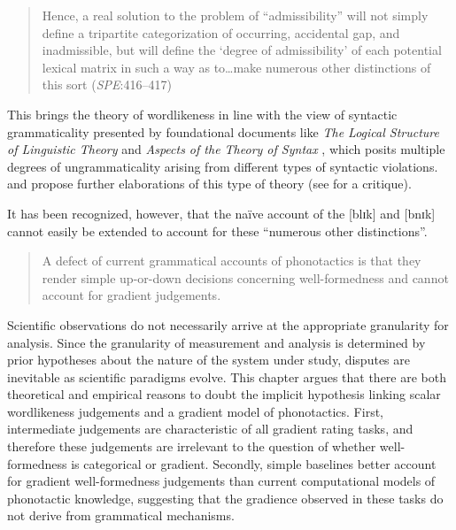\begin{quote}
Hence, a real solution to the problem of ``admissibility'' will not simply define a tripartite categorization of occurring, accidental gap, and inadmissible, but will define the `degree of admissibility' of each potential lexical matrix in such a way as to\ldots{}make numerous other distinctions of this sort (\emph{SPE}:416--417)
\end{quote}

\noindent
This brings the theory of wordlikeness in line with the view of syntactic grammaticality presented by foundational documents like \emph{The Logical Structure of Linguistic Theory} \citep{LSLT} and \emph{Aspects of the Theory of Syntax} \citep{ASPECTS}, which posits multiple degrees of ungrammaticality arising from different types of syntactic violations.
\citet{BARRIERS} and \citet{Huang1982} propose further elaborations of this type of theory (see \citealt[43f.]{Schutze1996} for a critique).

It has been recognized, however, that the naïve account of the [blɪk] and [bnɪk] cannot easily be extended to account for these ``numerous other distinctions''.

\begin{quote}
A defect of current grammatical accounts of phonotactics is that they render simple up-or-down decisions concerning well-formedness and cannot account for gradient judgements. \citep[371]{Shademan2006}
\end{quote}

Scientific observations do not necessarily arrive at the appropriate granularity for analysis.
Since the granularity of measurement and analysis is determined by prior hypotheses about the nature of the system under study, disputes are inevitable as scientific paradigms evolve. 
This chapter argues that there are both theoretical and empirical reasons to doubt the implicit hypothesis linking scalar wordlikeness judgements and a gradient model of phonotactics. 
First, intermediate judgements are characteristic of all gradient rating tasks, and therefore these judgements are irrelevant to the question of whether well-formedness is categorical or gradient.
Secondly, simple baselines better account for gradient well-formedness judgements than current computational models of phonotactic knowledge, suggesting that the gradience observed in these tasks do not derive from grammatical mechanisms.



